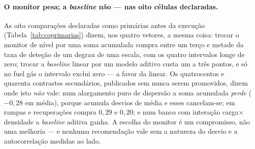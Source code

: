 \paragraph{O monitor pesa; a \emph{baseline} não --- nas oito células
declaradas.} As oito comparações declaradas como primárias antes da
execução (Tabela~\ref{tab:coprimarias}) dizem, nos quatro vetores, a mesma
coisa: trocar o monitor de nível por uma soma acumulada compra entre um terço
e metade da taxa de deteção de um degrau de uma escala, com os quatro
intervalos longe de zero; trocar a \emph{baseline} linear por um modelo
aditivo custa um a três pontos, e só no fuel gás o intervalo exclui zero ---
a favor da linear. Os quatrocentos e quarenta contrastes secundários,
publicados sem nunca serem promovidos, dizem onde isto \emph{não} vale: num
alargamento puro de dispersão a soma acumulada \emph{perde} ($-0{,}28$ em
média), porque acumula desvios de média e esses cancelam-se; em rampas e
recuperações compra $0{,}29$ e $0{,}20$; e num banco com interação
carga$\times$densidade a \emph{baseline} aditiva ganha. A escolha do monitor
é um compromisso, não uma melhoria --- e nenhuma recomendação vale sem a
natureza do desvio e a autocorrelação medidas ao lado.

